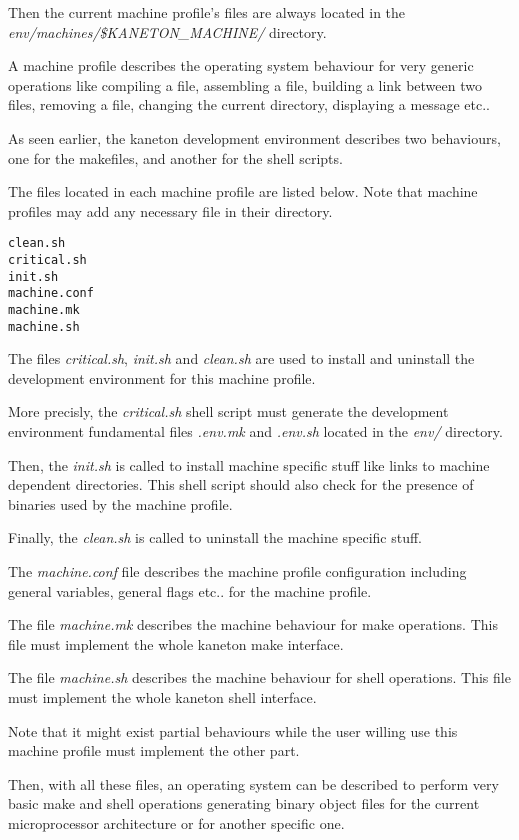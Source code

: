 Then the current machine profile's files are always located in the
\textit{env/machines/\$KANETON\_MACHINE/} directory.

A machine profile describes the operating system behaviour for very
generic operations like compiling a file, assembling a file, building
a link between two files, removing a file, changing the current directory,
displaying a message etc..

As seen earlier, the kaneton development environment describes two
behaviours, one for the makefiles, and another for the shell scripts.

The files located in each machine profile are listed below. Note that
machine profiles may add any necessary file in their directory.

\begin{verbatim}
clean.sh
critical.sh
init.sh
machine.conf
machine.mk
machine.sh
\end{verbatim}

The files \textit{critical.sh}, \textit{init.sh} and \textit{clean.sh} are
used to install and uninstall the development environment for this
machine profile.

More precisly, the \textit{critical.sh} shell script must generate
the development environment fundamental files \textit{.env.mk} and
\textit{.env.sh} located in the \textit{env/} directory.

Then, the \textit{init.sh} is called to install machine specific stuff
like links to machine dependent directories. This shell script should also
check for the presence of binaries used by the machine profile.

Finally, the \textit{clean.sh} is called to uninstall the machine
specific stuff.

The \textit{machine.conf} file describes the machine profile configuration
including general variables, general flags etc.. for the machine profile.

The file \textit{machine.mk} describes the machine behaviour for
make operations. This file must implement the whole kaneton make interface.

The file \textit{machine.sh} describes the machine behaviour for
shell operations. This file must implement the whole kaneton shell
interface.

Note that it might exist partial behaviours while the user willing use
this machine profile must implement the other part.

Then, with all these files, an operating system can be described to
perform very basic make and shell operations generating binary object
files for the current microprocessor architecture or for another specific
one.

